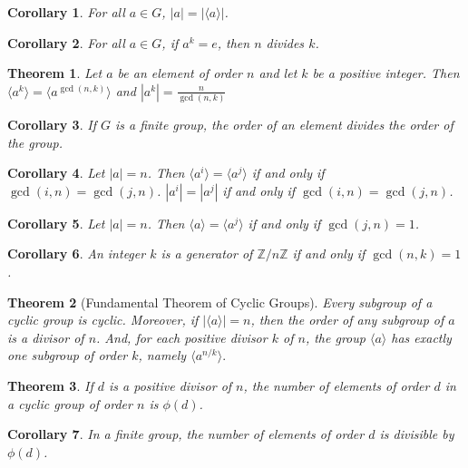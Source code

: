 \documentclass{article}
\newcommand{\Z}{\mathbb{Z}}
\newtheorem{theorem}{Theorem}[section]
\newtheorem*{corollary}{Corollary}
\theoremstyle{definition}
\begin{document}
\begin{corollary}
    For all $a \in G$, $|a| = |\langle a \rangle|$.
\end{corollary}

\begin{corollary}
    For all $a \in G$, if $a^k = e$, then $n$ divides $k$.
\end{corollary}

\begin{theorem}
    Let $a$ be an element of order $n$ and let $k$ be a positive integer. Then $\langle a^k \rangle = \langle a^{\gcd(n, k)} \rangle$ and $|a^k| = \frac{n}{\gcd(n, k)}$
\end{theorem}

\begin{corollary}
    If $G$ is a finite group, the order of an element divides the order of the group. 
\end{corollary}

\begin{corollary}
    Let $|a| = n$. Then $\langle a^i \rangle = \langle a^j \rangle$ if and only if $\gcd(i, n) = \gcd(j, n)$. $|a^i| = |a^j|$ if and only if $\gcd(i, n) = \gcd(j, n)$.
\end{corollary}

\begin{corollary}
    Let $|a| = n$. Then $\langle a \rangle = \langle a^j \rangle$ if and only if $\gcd(j, n) = 1$.
\end{corollary}

\begin{corollary}
    An integer $k$ is a generator of $\Z/n\Z$ if and only if $\gcd(n, k) = 1$.
\end{corollary}

\begin{theorem}[Fundamental Theorem of Cyclic Groups]
    Every subgroup of a cyclic group is cyclic. Moreover, if $|\langle a \rangle| = n$, then the order of any subgroup of $a$ is a divisor of $n$. And, for each positive divisor $k$ of $n$, the group $\langle a \rangle$ has exactly one subgroup of order $k$, namely $\langle a^{n/k} \rangle.$
\end{theorem}

\begin{theorem}
    If $d$ is a positive divisor of $n$, the number of elements of order $d$ in a cyclic group of order $n$ is $\phi(d)$.
\end{theorem}

\begin{corollary}
    In a finite group, the number of elements of order $d$ is divisible by $\phi(d)$. 
\end{corollary}
\end{document}
